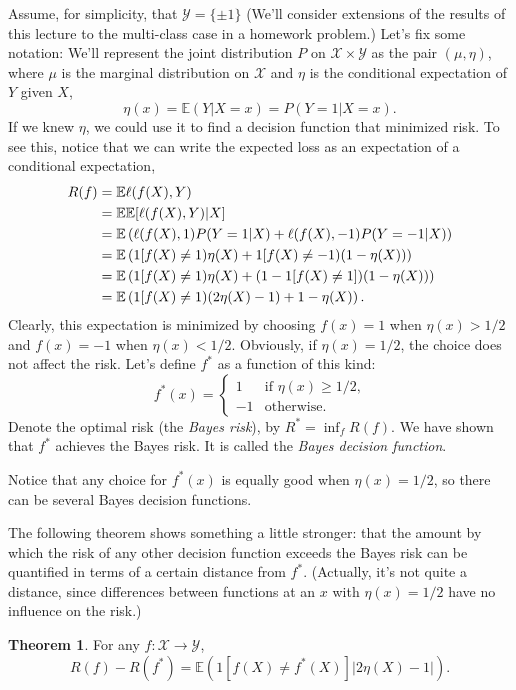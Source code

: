 \documentclass[twoside]{article}
\theoremstyle{definition}
\newtheorem{thm}{Theorem}[section]
\theoremstyle{definition}
\theoremstyle{remark}
\def\X{{\mathcal X}}
\def\Y{{\mathcal Y}}
\def\E{{\mathbb E}}
\begin{document}
Assume, for simplicity, that $\Y=\{\pm 1\}$ (We'll consider extensions
of the results of this lecture to the multi-class case in a
homework problem.)
Let's fix some notation: We'll represent the joint distribution $P$ on
$\X\times\Y$ as the pair $(\mu,\eta)$, where $\mu$ is the marginal
distribution on $\X$ and $\eta$ is the conditional expectation
of $Y$ given $X$,
  \[
    \eta(x) = \E(Y|X=x) = P(Y=1|X=x).
  \]
If we knew $\eta$, we could use it to find a decision function that
minimized risk. To see this, notice that we can write the expected
loss as an expectation of a conditional expectation,
  \begin{align}
    R(f) & = \E\ell(f(X),Y) \notag\\
         & = \E\E[\ell(f(X),Y)|X] \notag\\
         & = \E\left(\ell(f(X),1)P(Y=1|X) +
         \ell(f(X),-1)P(Y=-1|X)\right) \notag\\
         & = \E\left(1[f(X)\not =1)\eta(X) +
         1[f(X)\not=-1)(1-\eta(X))\right) \notag\\
         & = \E\left(1[f(X)\not =1)\eta(X) +
         (1-1[f(X)\not=1])(1-\eta(X))\right) \notag\\
         & = \E\left(1[f(X)\not =1)(2\eta(X)-1) +
         1-\eta(X)\right). \label{eqn:Rfeta}
  \end{align}
Clearly, this expectation is minimized by choosing $f(x)=1$ when
$\eta(x)>1/2$ and $f(x)=-1$ when
$\eta(x)<1/2$. Obviously, if $\eta(x)=1/2$, the choice does not affect
the risk. Let's define $f^*$ as a function of this kind:
  \[
    f^*(x) = \begin{cases} 1 & \text{if $\eta(x)\ge 1/2$,}\\
    -1 & \text{otherwise.}\end{cases}
  \]
Denote the optimal risk (the {\em Bayes risk}), by $R^*=\inf_f
R(f)$. We have shown that $f^*$ achieves the Bayes risk. It is called
the {\em Bayes decision function}.

Notice that any choice for $f^*(x)$ is equally
good when $\eta(x)=1/2$, so there can be several Bayes decision
functions.

The following theorem shows something a little stronger:
that the amount by which the risk of any other decision function
exceeds the Bayes risk can be quantified in terms of a certain
distance from $f^*$.  (Actually, it's not quite a distance, since
differences between functions
at an $x$ with $\eta(x)=1/2$ have no influence on the risk.)

\begin{thm}
  For any $f:\X\to\Y$,
    \[
      R(f)-R(f^*) = \E\left(1[f(X)\not=f^*(X)]|2\eta(X)-1|\right).
    \]
\end{thm}
\end{document}
